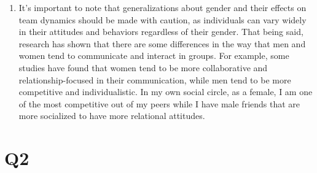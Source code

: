 \documentclass[12pt, letterpaper, titlepage]{article}
\begin{document}
\begin{enumerate}
    \item It's important to note that generalizations about gender and their effects on team dynamics should be made with caution, as individuals can vary widely in their attitudes and behaviors regardless of their gender. That being said, research has shown that there are some differences in the way that men and women tend to communicate and interact in groups. For example, some studies have found that women tend to be more collaborative and relationship-focused in their communication, while men tend to be more competitive and individualistic. In my own social circle, as a female, I am one of the most competitive out of my peers while I have male friends that are more socialized to have more relational attitudes. 
\end{enumerate}

\section*{Q2}
\end{document}
